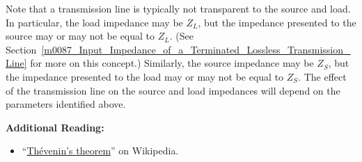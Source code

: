 Note that a transmission line is typically not transparent to the source and load.
In particular, the load impedance may be $Z_L$, but the impedance presented to the source may or may not be equal to $Z_L$.
(See Section~\ref{m0087_Input_Impedance_of_a_Terminated_Lossless_Transmission_Line} for more on this concept.)
Similarly, the source impedance may be $Z_S$, but the impedance presented to the load may or may not be equal to $Z_S$.
The effect of the transmission line on the source and load impedances will depend on the parameters identified above.


{\bf Additional Reading:}
\begin{itemize}
\item ``\href{https://en.wikipedia.org/wiki/Thevenin's_theorem}{Th\'{e}venin's theorem}'' on Wikipedia.
\end{itemize}


